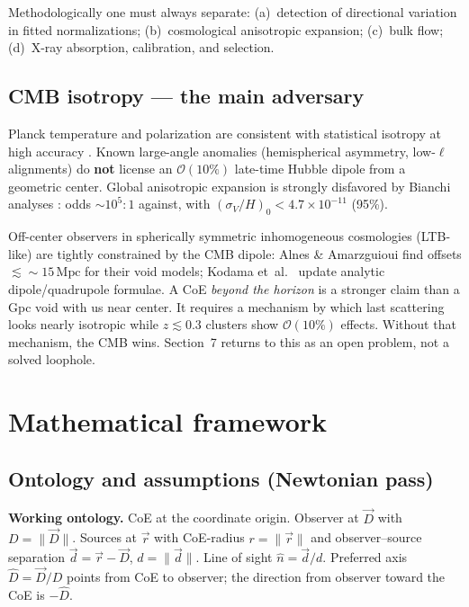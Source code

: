 \documentclass[11pt,a4paper]{article}
\begin{document}
Methodologically one must always separate: (a)~detection of directional variation in fitted normalizations; (b)~cosmological anisotropic expansion; (c)~bulk flow; (d)~X-ray absorption, calibration, and selection.

\subsection{CMB isotropy --- the main adversary}

Planck temperature and polarization are consistent with statistical isotropy at high accuracy \cite{Planck2018VII}. Known large-angle anomalies (hemispherical asymmetry, low-\(\ell\) alignments) do \textbf{not} license an \(\mathcal{O}(10\%)\) late-time Hubble dipole from a geometric center. Global anisotropic expansion is strongly disfavored by Bianchi analyses \cite{Saadeh2016}: odds \(\sim 10^5:1\) against, with \((\sigma_V/H)_0 < 4.7\times 10^{-11}\) (95\%).

Off-center observers in spherically symmetric inhomogeneous cosmologies (LTB-like) are tightly constrained by the CMB dipole: Alnes \& Amarzguioui \cite{Alnes2006} find offsets \(\lesssim\sim 15\,\mathrm{Mpc}\) for their void models; Kodama et~al.\ \cite{Kodama2010} update analytic dipole/quadrupole formulae. A CoE \emph{beyond the horizon} is a stronger claim than a Gpc void with us near center. It requires a mechanism by which last scattering looks nearly isotropic while \(z\lesssim 0.3\) clusters show \(\mathcal{O}(10\%)\) effects. Without that mechanism, the CMB wins. Section~7 returns to this as an open problem, not a solved loophole.

\section{Mathematical framework}

\subsection{Ontology and assumptions (Newtonian pass)}

\textbf{Working ontology.} CoE at the coordinate origin. Observer at \(\vec{D}\) with \(D=\|\vec{D}\|\). Sources at \(\vec{r}\) with CoE-radius \(r=\|\vec{r}\|\) and observer--source separation \(\vec{d}=\vec{r}-\vec{D}\), \(d=\|\vec{d}\|\). Line of sight \(\hat{n}=\vec{d}/d\). Preferred axis \(\hat{D}=\vec{D}/D\) points from CoE to observer; the direction from observer toward the CoE is \(-\hat{D}\).
\end{document}
